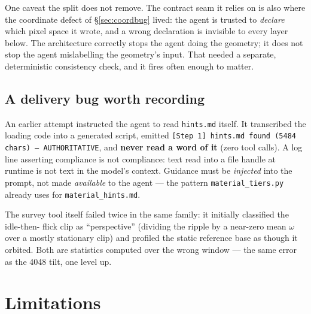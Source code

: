 \documentclass[11pt,a4paper]{article}
\begin{document}
One caveat the split does not remove. The contract seam it relies on is also where the coordinate
defect of \S\ref{sec:coordbug} lived: the agent is trusted to \emph{declare} which pixel space it
wrote, and a wrong declaration is invisible to every layer below. The architecture correctly stops
the agent doing the geometry; it does not stop the agent mislabelling the geometry's input. That
needed a separate, deterministic consistency check, and it fires often enough to matter.

\subsection{A delivery bug worth recording}
\label{sec:survey-bugs}

An earlier attempt instructed the agent to read \texttt{hints.md} itself. It transcribed the
loading code into a generated script, emitted
\texttt{[Step 1] hints.md found (5484 chars) --- AUTHORITATIVE}, and \textbf{never read a word
of it} (zero tool calls). A log line asserting compliance is not compliance: text read into a
file handle at runtime is not text in the model's context. Guidance must be \emph{injected}
into the prompt, not made \emph{available} to the agent --- the pattern
\texttt{material\_tiers.py} already uses for \texttt{material\_hints.md}.

The survey tool itself failed twice in the same family: it initially classified the idle-then-
flick clip as ``perspective'' (dividing the ripple by a near-zero mean $\omega$ over a mostly
stationary clip) and profiled the static reference base as though it orbited. Both are
statistics computed over the wrong window --- the same error as the 4048 tilt, one level up.

\section{Limitations}
\label{sec:limits}
\end{document}
